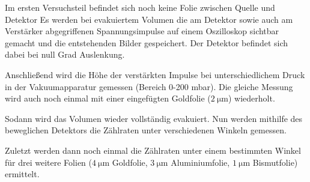 Im ersten Versuchsteil befindet sich noch keine Folie zwischen Quelle und Detektor
Es werden bei evakuiertem Volumen die am Detektor sowie auch am Verstärker
abgegriffenen  Spannungsimpulse auf einem Oszilloskop sichtbar gemacht und die
entstehenden Bilder gespeichert. Der Detektor befindet sich dabei bei null Grad Auslenkung.

Anschließend wird die Höhe der verstärkten Impulse bei unterschiedlichem Druck
in der Vakuumapparatur gemessen (Bereich 0-200 mbar). Die gleiche Messung wird auch
noch einmal mit einer eingefügten Goldfolie ($\SI{2}{\micro\meter}$) wiederholt.

Sodann wird das Volumen wieder vollständig evakuiert. Nun werden
mithilfe des beweglichen Detektors die Zählraten unter verschiedenen Winkeln gemessen.

Zuletzt werden dann noch einmal die Zählraten unter einem bestimmten Winkel für
drei weitere Folien ($\SI{4}{\micro\meter}$ Goldfolie, $\SI{3}{\micro\meter}$ Aluminiumfolie,
$\SI{1}{\micro\meter}$ Bismutfolie) ermittelt.
